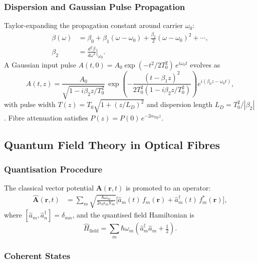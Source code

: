 \documentclass[journal,twocolumn]{IEEEtran}
\theoremstyle{definition}
\theoremstyle{plain}
\begin{document}
\subsubsection{Dispersion and Gaussian Pulse Propagation}

Taylor-expanding the propagation constant around carrier $\omega_0$:
\begin{align}
  \beta(\omega) &= \beta_0+\beta_1(\omega-\omega_0)
    +\frac{\beta_2}{2}(\omega-\omega_0)^2+\cdots,\nonumber\\
  \beta_2 &= \frac{d^2\beta}{d\omega^2}\bigg|_{\omega_0}.
\end{align}
A Gaussian input pulse
$A(t,0)=A_0\exp(-t^2/2T_0^2)\,e^{i\omega_0 t}$ evolves as
\begin{equation}
  A(t,z)=\frac{A_0}{\sqrt{1-i\beta_2 z/T_0^2}}\,
  \exp\!\left(-\frac{(t-\beta_1 z)^2}{2T_0^2(1-i\beta_2 z/T_0^2)}\right)
  e^{i(\beta_0 z-\omega_0 t)},
\end{equation}
with pulse width $T(z)=T_0\sqrt{1+(z/L_D)^2}$ and dispersion length
$L_D=T_0^2/|\beta_2|$. Fibre attenuation satisfies
$P(z)=P(0)\,e^{-2\alpha_{\mathrm{Np}}z}$.

\subsection{Quantum Field Theory in Optical Fibres}

\subsubsection{Quantisation Procedure}

The classical vector potential $\mathbf{A}(\mathbf{r},t)$ is promoted
to an operator:
\begin{align}
  \hat{\mathbf{A}}(\mathbf{r},t) &= \sum_m
  \sqrt{\frac{\hbar\omega_m}{2\epsilon_0\epsilon_m V_m}}
  \bigl[\hat{a}_m(t)\,f_m(\mathbf{r})
  +\hat{a}_m^\dagger(t)\,f_m^*(\mathbf{r})\bigr],
  \label{eq:quantisation}
\end{align}
where $[\hat{a}_m,\hat{a}_n^\dagger]=\delta_{mn}$, and the quantised
field Hamiltonian is
\begin{equation}
  \hat{H}_{\mathrm{field}}=\sum_m\hbar\omega_m\!
  \left(\hat{a}_m^\dagger\hat{a}_m+\tfrac{1}{2}\right).
\end{equation}

\subsubsection{Coherent States}
\end{document}
